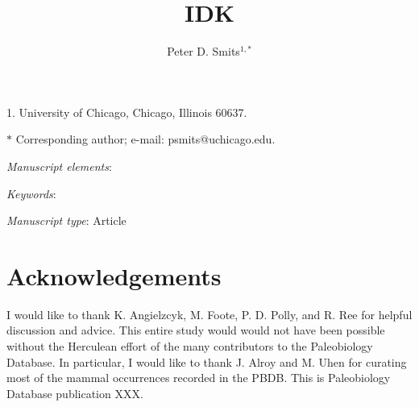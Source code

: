 \documentclass[11pt]{article}
\title{IDK}
\author{Peter D. Smits$^{1, \ast}$\\}
\date{}
\begin{document}
\maketitle

\noindent{}1. University of Chicago, Chicago, Illinois 60637.

\noindent{}$\ast$ Corresponding author; e-mail: psmits@uchicago.edu.

\bigskip

\textit{Manuscript elements}:

\bigskip

\textit{Keywords}:

\bigskip

\textit{Manuscript type}: Article

\bigskip


\linenumbers
\modulolinenumbers[2]

\newpage{}

%

%



%

%


\section*{Acknowledgements}
I would like to thank K. Angielzcyk, M. Foote, P. D. Polly, and R. Ree for helpful discussion and advice. This entire study would would not have been possible without the Herculean effort of the many contributors to the Paleobiology Database. In particular, I would like to thank J. Alroy and M. Uhen for curating most of the mammal occurrences recorded in the PBDB. This is Paleobiology Database publication XXX.

\clearpage




\clearpage
\end{document}
